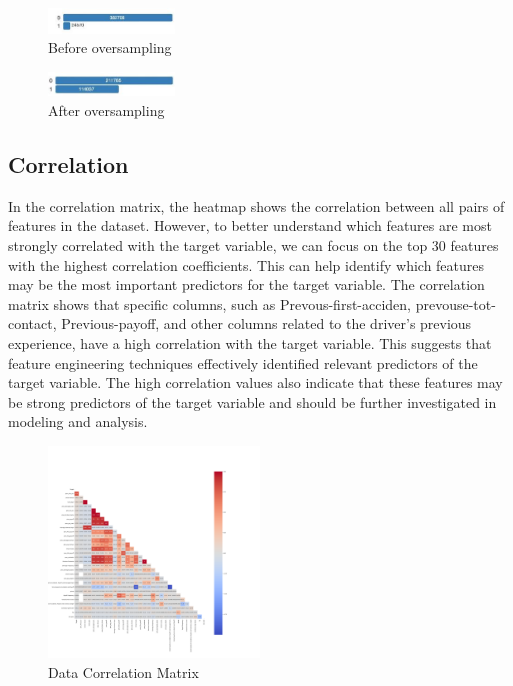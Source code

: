 \documentclass{IEEEtran}
\begin{document}
\begin{figure}[h]
\centering
\includegraphics[width=0.3\textwidth]{bef.JPG}
\caption{\label{fig:bef}Before oversampling   }
\end{figure}

\begin{figure}[h]
\centering
\includegraphics[width=0.3\textwidth]{af.JPG}
\caption{\label{fig:af}After oversampling   }
\end{figure}

\subsection{Correlation }

 In the correlation matrix, the heatmap shows the correlation between all pairs of features in the dataset. However, to better understand which features are most strongly correlated with the target variable, we can focus on the top 30 features with the highest correlation coefficients. This can help identify which features may be the most important predictors for the target variable. The correlation matrix shows that specific columns, such as Prevous-first-acciden, prevouse-tot-contact, Previous-payoff, and other columns related to the driver's previous experience, have a high correlation with the target variable. This suggests that feature engineering techniques effectively identified relevant predictors of the target variable. The high correlation values also indicate that these features may be strong predictors of the target variable and should be further investigated in modeling and analysis.


 

\begin{figure}[h]
\centering
\includegraphics[width=0.5\textwidth]{cc.png}
\caption{\label{fig:cc}Data Correlation Matrix   }
\end{figure}
\end{document}
